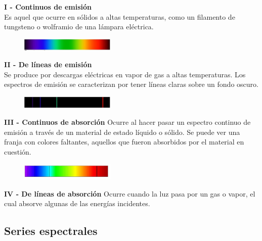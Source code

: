 \documentclass[a4paper]{article}
\begin{document}
        \textbf{I - Continuos de emisión} \\
            \indent Es aquel que ocurre en sólidos a altas temperaturas, como un filamento de tungsteno o wolframio de una lámpara eléctrica.

            \begin{figure}[h!]
                \centering
                \includegraphics[width=4.5cm]{../imagenes/espectroContinuoDeEmision.png}
            \end{figure}

        \textbf{II - De líneas de emisión} \\
            \indent Se produce por descargas eléctricas en vapor de gas a altas temperaturas.
            \indent Los espectros de emisión se caracterizan por tener líneas claras sobre un fondo oscuro.

            \begin{figure}[h!]
                \centering
                \includegraphics[width=4.5cm]{../imagenes/espectroLineasDeEmision.png}
            \end{figure}

        \textbf{III - Continuos de absorción}
            \indent Ocurre al hacer pasar un espectro continuo de emisión a través de un material de estado líquido o sólido. Se puede ver una franja con colores faltantes, aquellos que fueron absorbidos por el material en cuestión.

            \begin{figure}[h!]
                \centering
                \includegraphics[width=4.5cm]{../imagenes/espectroContinuoDeAbsorcion.png}
            \end{figure}

        \textbf{IV - De líneas de absorción}
            \indent Ocurre cuando la luz pasa por un gas o vapor, el cual absorve algunas de las energías incidentes.

    \subsection{Series espectrales}
\end{document}
